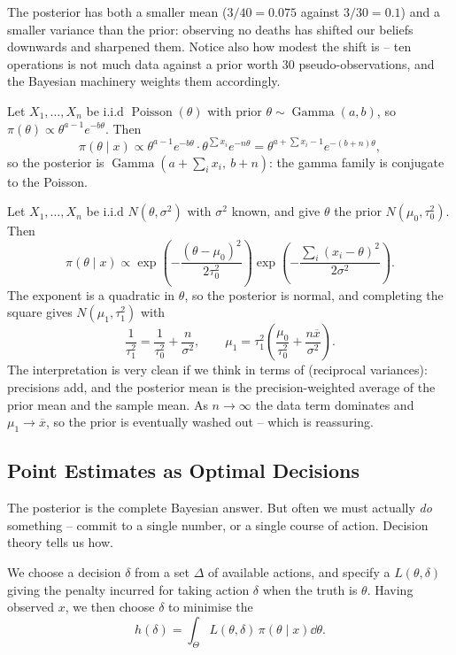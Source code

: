 \documentclass[a4paper]{scrartcl}
\newcommand{\Poisson}{\operatorname{Poisson}}
\newcommand{\Gam}{\operatorname{Gamma}}
\begin{document}
\begin{example}
  The posterior has both a smaller mean ($3/40 = 0.075$ against $3/30 = 0.1$) and a smaller variance than the prior: observing no deaths has shifted our beliefs downwards and sharpened them. Notice also how modest the shift is -- ten operations is not much data against a prior worth $30$ pseudo-observations, and the Bayesian machinery weights them accordingly.
\end{example}

\begin{example}
  Let $X_1, \dots, X_n$ be i.i.d $\Poisson(\theta)$ with prior $\theta \sim \Gam(a, b)$, so $\pi(\theta) \propto \theta^{a-1}e^{-b\theta}$. Then
  $$
  \pi(\theta\mid x) \propto \theta^{a-1}e^{-b\theta}\cdot \theta^{\sum x_i}e^{-n\theta} = \theta^{a + \sum x_i - 1}e^{-(b+n)\theta},
  $$
  so the posterior is $\Gam\left(a + \sum_i x_i,\ b + n\right)$: the gamma family is conjugate to the Poisson.
\end{example}

\begin{example}
  Let $X_1, \dots, X_n$ be i.i.d $N(\theta, \sigma^2)$ with $\sigma^2$ known, and give $\theta$ the prior $N(\mu_0, \tau_0^2)$. Then
  $$
  \pi(\theta\mid x) \propto \exp\left(-\frac{(\theta - \mu_0)^2}{2\tau_0^2}\right)\exp\left(-\frac{\sum_i(x_i - \theta)^2}{2\sigma^2}\right).
  $$
  The exponent is a quadratic in $\theta$, so the posterior is normal, and completing the square gives $N(\mu_1, \tau_1^2)$ with
  $$
  \frac{1}{\tau_1^2} = \frac{1}{\tau_0^2} + \frac{n}{\sigma^2}, \qquad \mu_1 = \tau_1^2\left(\frac{\mu_0}{\tau_0^2} + \frac{n\overline{x}}{\sigma^2}\right).
  $$
  The interpretation is very clean if we think in terms of  (reciprocal variances): precisions add, and the posterior mean is the precision-weighted average of the prior mean and the sample mean. As $n \to \infty$ the data term dominates and $\mu_1 \to \overline{x}$, so the prior is eventually washed out -- which is reassuring.
\end{example}

\subsection{Point Estimates as Optimal Decisions}

The posterior is the complete Bayesian answer. But often we must actually \emph{do} something -- commit to a single number, or a single course of action. Decision theory tells us how.

We choose a decision $\delta$ from a set $\Delta$ of available actions, and specify a  $L(\theta,\delta)$ giving the penalty incurred for taking action $\delta$ when the truth is $\theta$. Having observed $x$, we then choose $\delta$ to minimise the 
$$
h(\delta) = \int_\Theta L(\theta,\delta)\,\pi(\theta\mid x)\dd\theta.
$$
\end{document}

